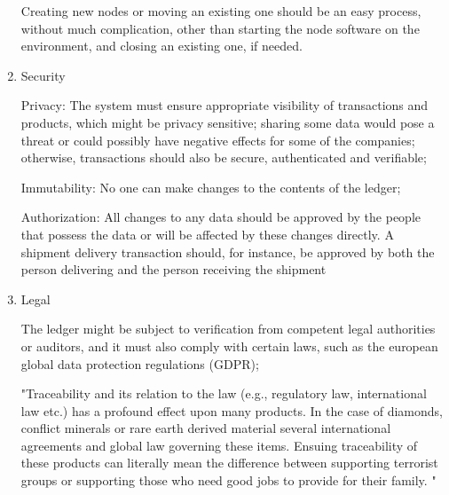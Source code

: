 \begin{enumerate}
		\par Creating new nodes or moving an existing one should be an easy process, without much complication, other than starting the node software on the environment, and closing an existing one, if needed.
    \item  Security
		\par Privacy: The system must ensure appropriate visibility of transactions and products, which might be privacy sensitive; sharing some data would pose a threat or could possibly have negative effects for some of the companies; otherwise, transactions should also be secure, authenticated and verifiable;
		\par Immutability: No one can make changes to the contents of the ledger;
		\par Authorization: All changes to any data should be approved by the people that possess the data or will be affected by these changes directly. A shipment delivery transaction should, for instance, be approved by both the person delivering and the person receiving the shipment
	\item  Legal
		\par The ledger might be subject to verification from competent legal authorities or auditors, and it must also comply with certain laws, such as the european global data protection regulations (GDPR);
		\par "Traceability and its relation to the law (e.g., regulatory law, international law etc.) has a profound effect upon many products. In the case of diamonds, conflict minerals or rare earth derived material several international agreements and global law governing these items. Ensuing traceability of these products can literally mean the difference between supporting terrorist groups or supporting those who need good jobs to provide for their family. "
		
\end{enumerate}


